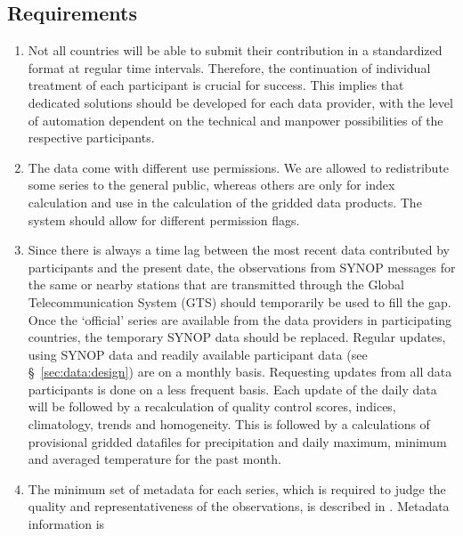 \documentclass[a4paper,11pt]{article}
\begin{document}
\subsection{Requirements}
\label{sec:require}

\begin{enumerate}
\item Not all countries will be able to submit their contribution in a
      standardized format at regular time intervals. Therefore, the
      continuation of individual treatment of each participant is
      crucial for success. This implies that dedicated solutions
      should be developed for each data provider, with the level of
      automation dependent on the technical and manpower possibilities
      of the respective participants.
\item The data come with different use permissions. We are allowed to
      redistribute some series to the general public, whereas others
      are only for index calculation and use in the calculation of the 
      gridded data products. The system should allow for different permission flags.
\item Since there is always a time lag between the most recent data
      contributed by participants and the present date, the
      observations from SYNOP messages for the same or nearby stations
      that are transmitted through the Global Telecommunication System
      (GTS) should temporarily be used to fill the gap. Once the
      `official' series are available from the data providers in
      participating countries, the temporary SYNOP data should be
      replaced. Regular updates, using SYNOP data and readily available
      participant data (see \S~\ref{sec:data:design}) are on a monthly
      basis. Requesting updates from all data participants is done on a
      less frequent basis. Each update of the daily data will be followed
      by a recalculation of quality control scores, indices, climatology, trends and
      homogeneity. This is followed by a calculations of provisional
      gridded datafiles for precipitation and daily maximum, minimum and averaged
      temperature for the past month.
\item The minimum set of metadata for each series, which is required
      to judge the quality and representativeness of the observations,
      is described in \citet{aguilar}. Metadata information is

\end{enumerate}
\end{document}
